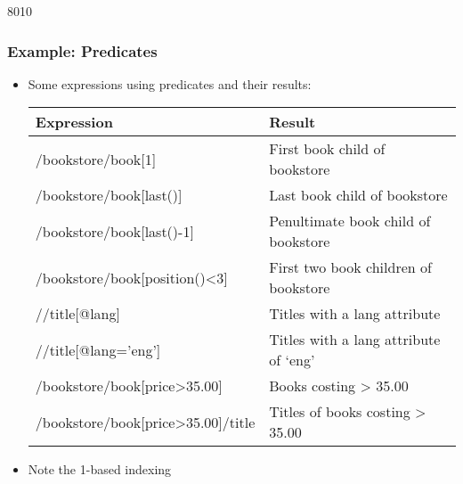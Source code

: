 \begin{slide}[fragile]{8010}
\frametitle{Example: Predicates}
\begin{itemize}
\item Some expressions using predicates and their results:
\begin{center}
\begin{tabular}{|l|l|}
\hline
\textbf{Expression}                 & \textbf{Result} \\ \hline
/bookstore/book[1]                  & First book child of bookstore \\ \hline
/bookstore/book[last()]             & Last book child of bookstore \\ \hline
/bookstore/book[last()-1]           & Penultimate book child of bookstore \\ \hline
/bookstore/book[position()<3]       & First two book children of bookstore \\ \hline
//title[@lang]                      & Titles with a lang attribute \\ \hline
//title[@lang='eng']                & Titles with a lang attribute of `eng' \\ \hline
/bookstore/book[price>35.00]        & Books costing > 35.00 \\ \hline
/bookstore/book[price>35.00]/title  & Titles of books costing > 35.00 \\ \hline
\end{tabular}
\end{center}
\item Note the 1-based indexing
\end{itemize}
\end{slide}


